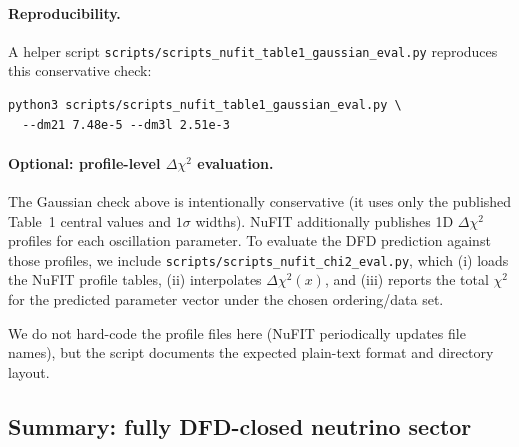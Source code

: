\paragraph{Reproducibility.}
A helper script \texttt{scripts/scripts\_nufit\_table1\_gaussian\_eval.py} reproduces 
this conservative check:
{\small
\begin{verbatim}
python3 scripts/scripts_nufit_table1_gaussian_eval.py \
  --dm21 7.48e-5 --dm3l 2.51e-3
\end{verbatim}
}

\paragraph{Optional: profile-level $\Delta\chi^2$ evaluation.}
The Gaussian check above is intentionally conservative (it uses only the published Table~1
central values and $1\sigma$ widths). NuFIT additionally publishes 1D $\Delta\chi^2$ profiles
for each oscillation parameter. To evaluate the DFD prediction against those profiles,
we include \texttt{scripts/scripts\_nufit\_chi2\_eval.py}, which (i) loads the NuFIT profile
tables, (ii) interpolates $\Delta\chi^2(x)$, and (iii) reports the total $\chi^2$ for the
predicted parameter vector under the chosen ordering/data set.

We do not hard-code the profile files here (NuFIT periodically updates file names), but the
script documents the expected plain-text format and directory layout.

\subsection{Summary: fully DFD-closed neutrino sector}\label{app:nu-summary}

